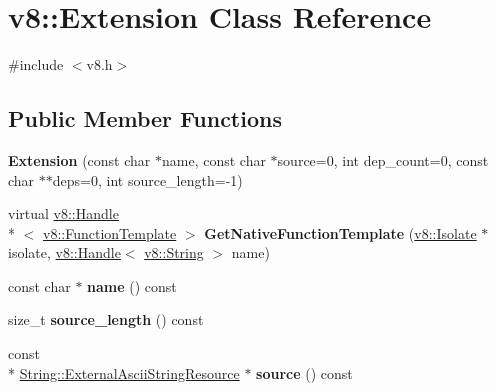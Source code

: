 \hypertarget{classv8_1_1Extension}{\section{v8\-:\-:Extension Class Reference}
\label{classv8_1_1Extension}
}


{\ttfamily \#include $<$v8.\-h$>$}

\subsection*{Public Member Functions}
\begin{DoxyCompactItemize}
\item 
\hypertarget{classv8_1_1Extension_a10868673b7801cc1139ca3bc09bcfcf6}{{\bfseries Extension} (const char $\ast$name, const char $\ast$source=0, int dep\-\_\-count=0, const char $\ast$$\ast$deps=0, int source\-\_\-length=-\/1)}\label{classv8_1_1Extension_a10868673b7801cc1139ca3bc09bcfcf6}

\item 
\hypertarget{classv8_1_1Extension_acd2dc16a3afa2ec737e9bc9adea977be}{virtual \hyperlink{classv8_1_1Handle}{v8\-::\-Handle}\\*
$<$ \hyperlink{classv8_1_1FunctionTemplate}{v8\-::\-Function\-Template} $>$ {\bfseries Get\-Native\-Function\-Template} (\hyperlink{classv8_1_1Isolate}{v8\-::\-Isolate} $\ast$isolate, \hyperlink{classv8_1_1Handle}{v8\-::\-Handle}$<$ \hyperlink{classv8_1_1String}{v8\-::\-String} $>$ name)}\label{classv8_1_1Extension_acd2dc16a3afa2ec737e9bc9adea977be}

\item 
\hypertarget{classv8_1_1Extension_a183946edbf28789f7cddecdad2d26f96}{const char $\ast$ {\bfseries name} () const }\label{classv8_1_1Extension_a183946edbf28789f7cddecdad2d26f96}

\item 
\hypertarget{classv8_1_1Extension_a91da6067f79c5c354aa3184ed0746966}{size\-\_\-t {\bfseries source\-\_\-length} () const }\label{classv8_1_1Extension_a91da6067f79c5c354aa3184ed0746966}

\item 
\hypertarget{classv8_1_1Extension_a97aa9a425f31d453161540e37c19c0ce}{const \\*
\hyperlink{classv8_1_1String_1_1ExternalAsciiStringResource}{String\-::\-External\-Ascii\-String\-Resource} $\ast$ {\bfseries source} () const }\label{classv8_1_1Extension_a97aa9a425f31d453161540e37c19c0ce}


\end{DoxyCompactItemize}
